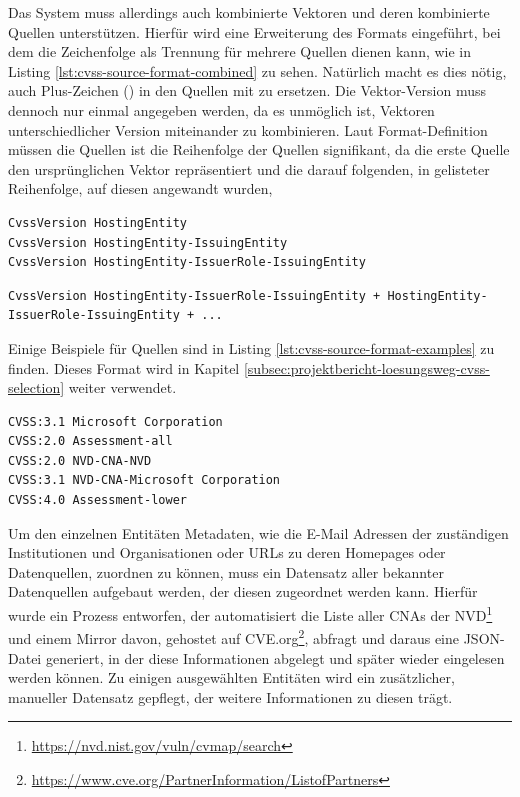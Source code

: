 Das System muss allerdings auch kombinierte Vektoren und deren kombinierte Quellen unterstützen.
Hierfür wird eine Erweiterung des Formats eingeführt, bei dem die Zeichenfolge \qt{ + } als Trennung für mehrere Quellen dienen kann, wie in Listing \ref{lst:cvss-source-format-combined} zu sehen.
Natürlich macht es dies nötig, auch Plus-Zeichen (\qt{+}) in den Quellen mit \qt{\\+} zu ersetzen.
Die Vektor-Version muss dennoch nur einmal angegeben werden, da es unmöglich ist, Vektoren unterschiedlicher Version miteinander zu kombinieren.
Laut Format-Definition müssen die Quellen ist die Reihenfolge der Quellen signifikant, da die erste Quelle den ursprünglichen Vektor repräsentiert und die darauf folgenden, in gelisteter Reihenfolge, auf diesen angewandt wurden,

\begin{lstlisting}[language={}, label={lst:cvss-source-format}, caption={CVSS Sources Format}]
CvssVersion HostingEntity
CvssVersion HostingEntity-IssuingEntity
CvssVersion HostingEntity-IssuerRole-IssuingEntity
\end{lstlisting}

\begin{lstlisting}[language={}, label={lst:cvss-source-format-combined}, caption={CVSS Sources Format}]
CvssVersion HostingEntity-IssuerRole-IssuingEntity + HostingEntity-IssuerRole-IssuingEntity + ...
\end{lstlisting}

Einige Beispiele für Quellen sind in Listing \ref{lst:cvss-source-format-examples} zu finden.
Dieses Format wird in Kapitel \ref{subsec:projektbericht-loesungsweg-cvss-selection} weiter verwendet.

\begin{lstlisting}[language={}, label={lst:cvss-source-format-examples}, caption={CVSS Sources Format}]
CVSS:3.1 Microsoft Corporation
CVSS:2.0 Assessment-all
CVSS:2.0 NVD-CNA-NVD
CVSS:3.1 NVD-CNA-Microsoft Corporation
CVSS:4.0 Assessment-lower
\end{lstlisting}

Um den einzelnen Entitäten Metadaten, wie die E-Mail Adressen der zuständigen Institutionen und Organisationen oder URLs zu deren Homepages oder Datenquellen, zuordnen zu können, muss ein Datensatz aller bekannter Datenquellen aufgebaut werden, der diesen zugeordnet werden kann.
Hierfür wurde ein Prozess entworfen, der automatisiert die Liste aller CNAs der NVD\footnote{\url{https://nvd.nist.gov/vuln/cvmap/search}} und einem Mirror davon, gehostet auf CVE.org\footnote{\url{https://www.cve.org/PartnerInformation/ListofPartners}}, abfragt und daraus eine JSON-Datei generiert, in der diese Informationen abgelegt und später wieder eingelesen werden können.
Zu einigen ausgewählten Entitäten wird ein zusätzlicher, manueller Datensatz gepflegt, der weitere Informationen zu diesen trägt.

